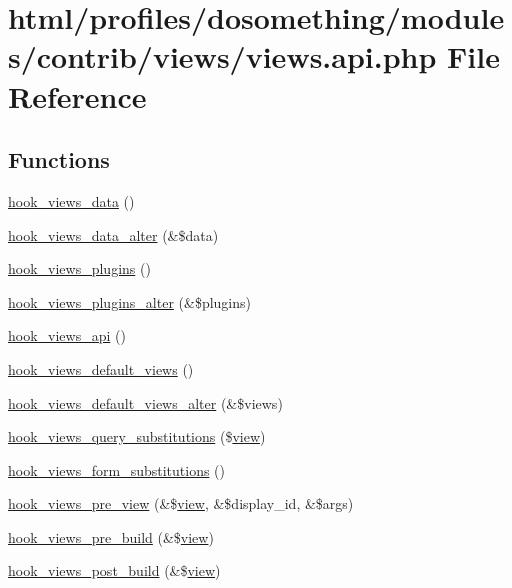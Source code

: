 \hypertarget{views_8api_8php}{
\section{html/profiles/dosomething/modules/contrib/views/views.api.php File Reference}
\label{views_8api_8php}
}
\subsection*{Functions}
\begin{DoxyCompactItemize}
\item 
\hyperlink{group__views__hooks_ga227057901681e4a33e33c199c7a8c989}{hook\_\-views\_\-data} ()
\item 
\hyperlink{group__views__hooks_ga6ae0bb0d2385e03c32b57625b6d35826}{hook\_\-views\_\-data\_\-alter} (\&\$data)
\item 
\hyperlink{group__views__hooks_ga23f6e9972b2ed84fc54b7ff63f44477d}{hook\_\-views\_\-plugins} ()
\item 
\hyperlink{group__views__hooks_ga6c4e4c2a769b0017bf0edcd0adae57e9}{hook\_\-views\_\-plugins\_\-alter} (\&\$plugins)
\item 
\hyperlink{group__views__hooks_gac67ffd4a2f61f9814ee37b541c472c47}{hook\_\-views\_\-api} ()
\item 
\hyperlink{group__views__hooks_ga23edb74860682fa88f75cf94b97c2e15}{hook\_\-views\_\-default\_\-views} ()
\item 
\hyperlink{group__views__hooks_gacd31035a6ae9c7baf05ad034d6a65768}{hook\_\-views\_\-default\_\-views\_\-alter} (\&\$views)
\item 
\hyperlink{group__views__hooks_gac3628ab1f08eee5a2bd9c3c4b5bd4c3b}{hook\_\-views\_\-query\_\-substitutions} (\$\hyperlink{classview}{view})
\item 
\hyperlink{group__views__hooks_gaf51ae4253a5a2215dbf8dc56d8be7e60}{hook\_\-views\_\-form\_\-substitutions} ()
\item 
\hyperlink{group__views__hooks_ga471b90caa886a4e4239a839d6bf7a963}{hook\_\-views\_\-pre\_\-view} (\&\$\hyperlink{classview}{view}, \&\$display\_\-id, \&\$args)
\item 
\hyperlink{group__views__hooks_ga1c3fc52e2854310f84eeb43b98a0ba64}{hook\_\-views\_\-pre\_\-build} (\&\$\hyperlink{classview}{view})
\item 
\hyperlink{group__views__hooks_ga1c869865c1fafafcfb8a31a1fbc5c135}{hook\_\-views\_\-post\_\-build} (\&\$\hyperlink{classview}{view})

\end{DoxyCompactItemize}
